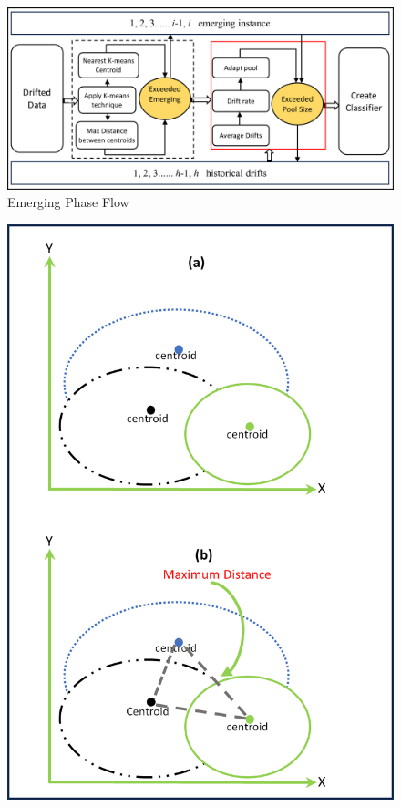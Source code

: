 \begin{figure}[ht]
	\centering
	\includegraphics[width=1\linewidth]{5_Emerging/images/pro2.png}
	\caption{Emerging Phase Flow}
	\label{fig:proposal_step_2}
\end{figure}
\begin{figure}[!ht]
    \centering
    \begin{minipage}{0.48\textwidth}
        \centering
        \includegraphics[width=\linewidth]{5_Emerging/images/scenario1.png}

\end{minipage}
\end{figure}
